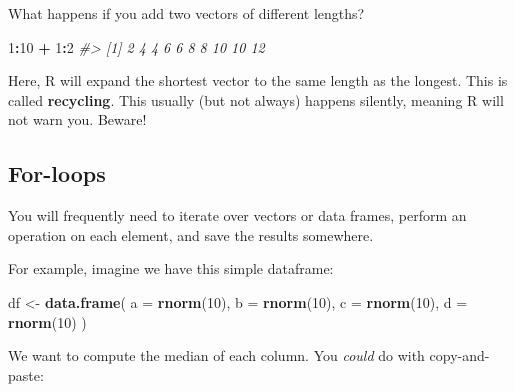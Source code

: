 \documentclass[]{book}
\newenvironment{Shaded}{\begin{snugshade}}{\end{snugshade}}
\newcommand{\CommentTok}[1]{\textcolor[rgb]{0.56,0.35,0.01}{\textit{#1}}}
\newcommand{\DataTypeTok}[1]{\textcolor[rgb]{0.13,0.29,0.53}{#1}}
\newcommand{\DecValTok}[1]{\textcolor[rgb]{0.00,0.00,0.81}{#1}}
\newcommand{\KeywordTok}[1]{\textcolor[rgb]{0.13,0.29,0.53}{\textbf{#1}}}
\newcommand{\NormalTok}[1]{#1}
\newcommand{\OperatorTok}[1]{\textcolor[rgb]{0.81,0.36,0.00}{\textbf{#1}}}
\newcommand{\StringTok}[1]{\textcolor[rgb]{0.31,0.60,0.02}{#1}}
\begin{document}
What happens if you add two vectors of different lengths?

\begin{Shaded}
\begin{Highlighting}[]
\DecValTok{1}\OperatorTok{:}\DecValTok{10} \OperatorTok{+}\StringTok{ }\DecValTok{1}\OperatorTok{:}\DecValTok{2}
\CommentTok{#>  [1]  2  4  4  6  6  8  8 10 10 12}
\end{Highlighting}
\end{Shaded}

Here, R will expand the shortest vector to the same length as the longest. This is called \textbf{recycling}. This usually (but not always) happens silently, meaning R will not warn you. Beware!

\hypertarget{for-loops}{%
\subsection{For-loops}\label{for-loops}}

You will frequently need to iterate over vectors or data frames, perform an operation on each element, and save the results somewhere.

For example, imagine we have this simple dataframe:

\begin{Shaded}
\begin{Highlighting}[]
\NormalTok{df <-}\StringTok{ }\KeywordTok{data.frame}\NormalTok{(}
  \DataTypeTok{a =} \KeywordTok{rnorm}\NormalTok{(}\DecValTok{10}\NormalTok{),}
  \DataTypeTok{b =} \KeywordTok{rnorm}\NormalTok{(}\DecValTok{10}\NormalTok{),}
  \DataTypeTok{c =} \KeywordTok{rnorm}\NormalTok{(}\DecValTok{10}\NormalTok{),}
  \DataTypeTok{d =} \KeywordTok{rnorm}\NormalTok{(}\DecValTok{10}\NormalTok{)}
\NormalTok{)}
\end{Highlighting}
\end{Shaded}

We want to compute the median of each column. You \emph{could} do with copy-and-paste:

\begin{Shaded}
\end{Shaded}
\end{document}
